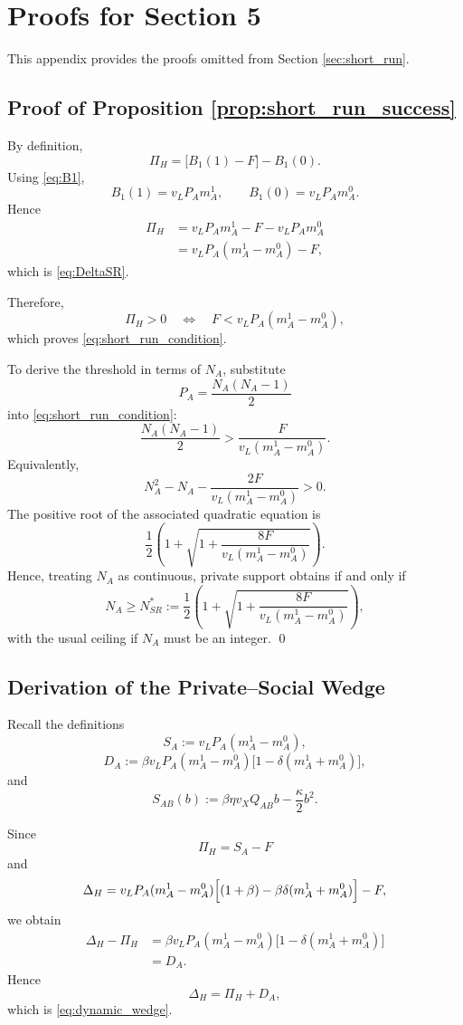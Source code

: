 \section{Proofs for Section 5}

This appendix provides the proofs omitted from Section \ref{sec:short_run}.

\subsection{Proof of Proposition \ref{prop:short_run_success}}

By definition,
\[
\Pi_H
=
\bigl[B_1(1)-F\bigr]-B_1(0).
\]
Using \eqref{eq:B1},
\[
B_1(1)=v_LP_A m_A^1,
\qquad
B_1(0)=v_LP_A m_A^0.
\]
Hence
\begin{align}
\Pi_H
&=
v_LP_A m_A^1-F-v_LP_A m_A^0
\nonumber\\
&=
v_LP_A(m_A^1-m_A^0)-F,
\label{eq:app5_PiH}
\end{align}
which is \eqref{eq:DeltaSR}.

Therefore,
\[
\Pi_H>0
\quad\Longleftrightarrow\quad
F<v_LP_A(m_A^1-m_A^0),
\]
which proves \eqref{eq:short_run_condition}.

To derive the threshold in terms of $N_A$, substitute
\[
P_A=\frac{N_A(N_A-1)}{2}
\]
into \eqref{eq:short_run_condition}:
\[
\frac{N_A(N_A-1)}{2}>
\frac{F}{v_L(m_A^1-m_A^0)}.
\]
Equivalently,
\[
N_A^2-N_A-\frac{2F}{v_L(m_A^1-m_A^0)}>0.
\]
The positive root of the associated quadratic equation is
\[
\frac{1}{2}
\left(
1+
\sqrt{1+\frac{8F}{v_L(m_A^1-m_A^0)}}
\right).
\]
Hence, treating $N_A$ as continuous, private support obtains if and only if
\[
N_A\ge
N_{SR}^*
:=
\frac{1}{2}
\left(
1+
\sqrt{1+\frac{8F}{v_L(m_A^1-m_A^0)}}
\right),
\]
with the usual ceiling if $N_A$ must be an integer.
\qed

\subsection{Derivation of the Private--Social Wedge}

Recall the definitions
\[
S_A:=v_LP_A(m_A^1-m_A^0),
\]
\[
D_A:=\beta v_LP_A(m_A^1-m_A^0)\bigl[1-\delta(m_A^1+m_A^0)\bigr],
\]
and
\[
S_{AB}(b):=\beta\eta v_XQ_{AB}b-\frac{\kappa}{2}b^2.
\]

Since
\[
\Pi_H=S_A-F
\]
and
\[
\Delta_H
=
v_LP_A(m_A^1-m_A^0)\Bigl[(1+\beta)-\beta\delta(m_A^1+m_A^0)\Bigr]-F,
\]
we obtain
\begin{align}
\Delta_H-\Pi_H
&=
\beta v_LP_A(m_A^1-m_A^0)\bigl[1-\delta(m_A^1+m_A^0)\bigr]
\nonumber\\
&=D_A.
\label{eq:app5_wedge}
\end{align}
Hence
\[
\Delta_H=\Pi_H+D_A,
\]
which is \eqref{eq:dynamic_wedge}.

